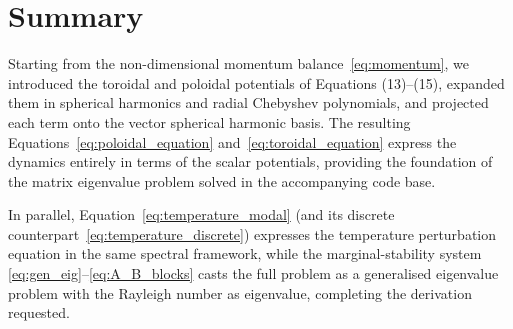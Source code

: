 \documentclass[11pt]{article}
\numberwithin{equation}{section}
\begin{document}
\section{Summary}
Starting from the non-dimensional momentum balance~\eqref{eq:momentum}, we introduced the toroidal and poloidal potentials of Equations (13)--(15), expanded them in spherical harmonics and radial Chebyshev polynomials, and projected each term onto the vector spherical harmonic basis. The resulting Equations~\eqref{eq:poloidal_equation} and~\eqref{eq:toroidal_equation} express the dynamics entirely in terms of the scalar potentials, providing the foundation of the matrix eigenvalue problem solved in the accompanying code base.

\bigskip
In parallel, Equation~\eqref{eq:temperature_modal} (and its discrete counterpart~\eqref{eq:temperature_discrete}) expresses the temperature perturbation equation in the same spectral framework, while the marginal-stability system \eqref{eq:gen_eig}--\eqref{eq:A_B_blocks} casts the full problem as a generalised eigenvalue problem with the Rayleigh number as eigenvalue, completing the derivation requested.
\end{document}
